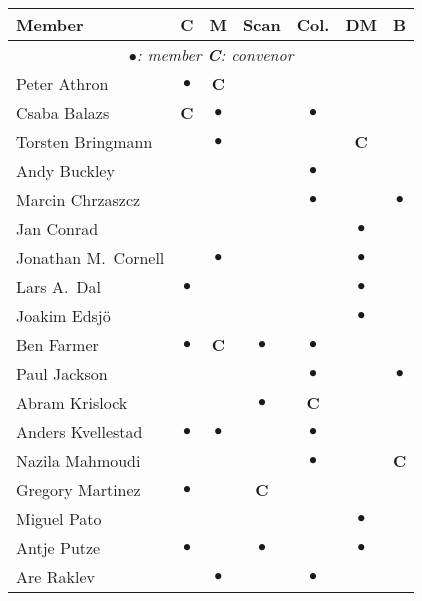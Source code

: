 \newcommand{\C}{\textbf{C}}            %
\newcommand{\M}{$\bullet$}             %
\newlength{\Mwidth} \settowidth{\Mwidth}{\M}
\newcommand{\E}{\makebox[\Mwidth]{}}   %
\begin{center}
\renewcommand{\arraystretch}{1.25}
\begin{tabular*}{0.99\textwidth}{@{\extracolsep{\fill}}|lcccccc|}
  \hline
  \textbf{Member} & \textbf{C}    & \textbf{M}   
                  & \textbf{Scan} & \textbf{Col.} 
                  & \textbf{DM}   & \textbf{B} \\
  \hline
  \multicolumn{7}{|c|}{\textit{\M{}: member \hspace{3em} \C{}: convenor}}\\
  Peter Athron          & \M&\C &    &    &    &    \\
  Csaba Balazs          & \C&\M &    & \M &    &    \\
  Torsten Bringmann     &   &\M &    &    & \C &    \\
  Andy Buckley          &   &   &    & \M &    &    \\
  Marcin Chrzaszcz		&   &   &    & \M &    & \M \\
  Jan Conrad            &   &   &    &    & \M &    \\
  Jonathan M.\ Cornell  &   &\M &    &    & \M &    \\
  Lars A.\ Dal          & \M&   &    &    & \M &    \\
  Joakim Edsj\"o        &   &   &    &    & \M &    \\
  Ben Farmer            & \M&\C & \M & \M &    &    \\
  Paul Jackson          &   &   &    & \M &    & \M \\
  Abram Krislock        &   &   & \M & \C &    &    \\
  Anders Kvellestad     & \M&\M &    & \M &    &    \\
  Nazila Mahmoudi       &   &   &    & \M &    & \C \\
  Gregory Martinez      & \M&   & \C &    &    &    \\
  Miguel Pato           &   &   &    &    & \M &    \\
  Antje Putze           & \M&   & \M &    & \M &    \\
  Are Raklev            &   &\M &    & \M &    &    \\

\end{tabular*}
\end{center}
